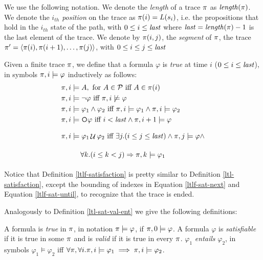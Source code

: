 We use the following notation. We denote the \emph{length} of a trace $\pi$ as $\mathit{length}(\pi)$. We denote the \emph{$i_{th}$ position} on the trace as $\pi(i) = L(s_i)$, i.e. the propositions that hold in the $i_{th}$ state of the path, with $0 \le i \le \mathit{last}$ where $\mathit{last} = \mathit{length}(\pi)-1$ is the last element of the trace. We denote by $\pi(i, j)$, the \emph{segment} of $\pi$, the trace $\pi' = \langle \pi(i), \pi(i+1), \dots, \pi(j) \rangle$, with $0 \le i \le j \le \mathit{last}$
\begin{definition}\label{ltlf-satisfaction}
	Given a finite trace $\pi$, we define that a \LTLf formula $\varphi$ is \emph{true} at time $i$ ($0 \le i \le \mathit{last}$), in symbols $\pi, i \models \varphi$ inductively as follows:
	\begin{align}
	\trace, i &\models A, \tm{for} A\in\Prop \tiff A \in \trace(i)\nonumber\\
	\trace, i &\models \lnot \varphi \tiff \trace, i \not\models \varphi\nonumber\\
	\trace, i &\models \varphi_1 \lAND \varphi_2 \tiff \trace, i \models \varphi_1 \lAND \trace, i \models \varphi_2\nonumber\\
	\trace, i &\models \Next\varphi \tiff i<\last \lAND \trace,i+1 \models \varphi \label{ltlf-sat-next}\\
	\trace, i &\models \varphi_1 \lUntil \varphi_2 \tiff \exists j. (i\le j \le \last) \lAND \trace,j \models \varphi \lAND\nonumber \\
	&\ind \forall k. (i\le k < j) \Rightarrow \trace, k \models \varphi_1 \label{ltlf-sat-until}
	\end{align}
\end{definition}
Notice that Definition \ref{ltlf-satisfaction} is pretty similar to Definition \ref{ltl-satisfaction}, except the bounding of indexes in Equation \ref{ltlf-sat-next} and Equation \ref{ltlf-sat-until}, to recognize that the trace is ended.
 
Analogously to Definition \ref{ltl-sat-val-ent} we give the following definitions:
\begin{definition}\label{ltlf-sat-val-ent}
	A \LTLf formula is \emph{true} in $\pi$, in notation $\pi \models \varphi$, if $\pi, 0 \models \varphi$. A formula $\varphi$ is \emph{satisfiable} if it is true in some $\pi$ and is \emph{valid} if it is true in every $\pi$. $\varphi_1$ \emph{entails} $\varphi_2$, in symbols $\varphi_1 \models \varphi_2$ iff $\forall \pi, \forall i.\pi, i \models \varphi_1 \implies \pi, i \models \varphi_2$.
\end{definition}

